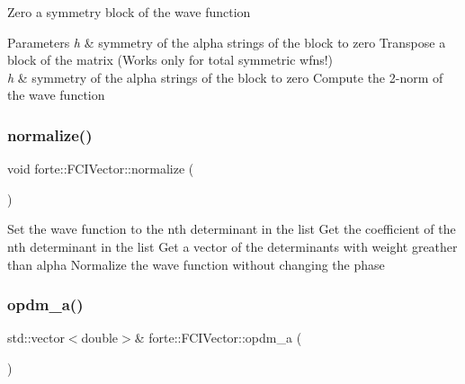 Zero a symmetry block of the wave function 
\begin{DoxyParams}{Parameters}
{\em h} & symmetry of the alpha strings of the block to zero Transpose a block of the matrix (Works only for total symmetric wfns!) \\
\hline
{\em h} & symmetry of the alpha strings of the block to zero Compute the 2-\/norm of the wave function \\
\hline
\end{DoxyParams}
\mbox{\label{classforte_1_1_f_c_i_vector_ad477a8c333a440f3b5f59e980f443484}} 
\subsubsection{\texorpdfstring{normalize()}{normalize()}}
{\footnotesize\ttfamily void forte\+::\+F\+C\+I\+Vector\+::normalize (\begin{DoxyParamCaption}{ }\end{DoxyParamCaption})}

Set the wave function to the nth determinant in the list Get the coefficient of the nth determinant in the list Get a vector of the determinants with weight greather than alpha Normalize the wave function without changing the phase \mbox{\label{classforte_1_1_f_c_i_vector_a6d0c2dafcf9e13600685db7f7a27cae6}} 
\subsubsection{\texorpdfstring{opdm\+\_\+a()}{opdm\_a()}}
{\footnotesize\ttfamily std\+::vector$<$double$>$\& forte\+::\+F\+C\+I\+Vector\+::opdm\+\_\+a (\begin{DoxyParamCaption}{ }\end{DoxyParamCaption})\hspace{0.3cm}{\ttfamily [inline]}}

\mbox{\label{classforte_1_1_f_c_i_vector_a345012bafb002400635091f98018589d}} 
